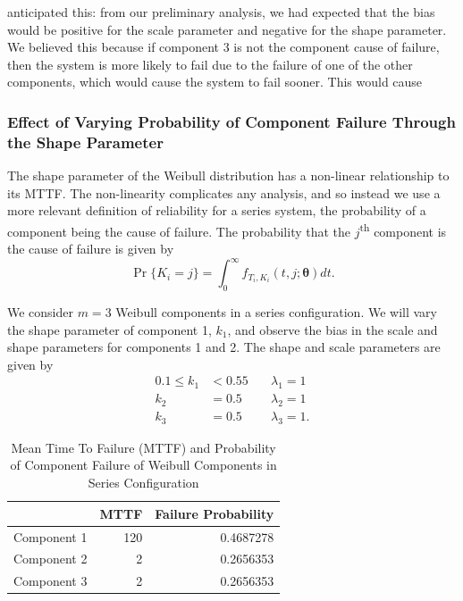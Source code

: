 \documentclass[
]{article}
\begin{document}
\begin{enumerate}
  anticipated this: from our preliminary analysis, we had expected that
  the bias would be positive for the scale parameter and negative for
  the shape parameter. We believed this because if component 3 is not
  the component cause of failure, then the system is more likely to fail
  due to the failure of one of the other components, which would cause
  the system to fail sooner. This would cause
\end{enumerate}

\hypertarget{effect-of-varying-probability-of-component-failure-through-the-shape-parameter}{%
\subsubsection{Effect of Varying Probability of Component Failure
Through the Shape
Parameter}\label{effect-of-varying-probability-of-component-failure-through-the-shape-parameter}}

The shape parameter of the Weibull distribution has a non-linear
relationship to its MTTF. The non-linearity complicates any analysis,
and so instead we use a more relevant definition of reliability for a
series system, the probability of a component being the cause of
failure. The probability that the \(j\)\textsuperscript{th} component is
the cause of failure is given by \[
\Pr\{K_i = j\} = \int_{0}^\infty f_{T_i, K_i}(t, j ; \boldsymbol{\theta}) dt.
\]

We consider \(m=3\) Weibull components in a series configuration. We
will vary the shape parameter of component 1, \(k_1\), and observe the
bias in the scale and shape parameters for components 1 and 2. The shape
and scale parameters are given by \begin{equation}
\begin{aligned}
    0.1 \leq k_1 &< 0.55    &\quad \lambda_1 = 1\\
             k_2 &= 0.5     &\quad \lambda_2 = 1\\
             k_3 &= 0.5     &\quad \lambda_3 = 1.
\end{aligned}
\end{equation}

\begin{table}

\caption{\label{tab:table-3}Mean Time To Failure (MTTF) and Probability of Component Failure of Weibull Components in Series Configuration}
\centering
\begin{tabular}[t]{l|r|r}
\hline
  & MTTF & Failure Probability\\
\hline
Component 1 & 120 & 0.4687278\\
\hline
Component 2 & 2 & 0.2656353\\
\hline
Component 3 & 2 & 0.2656353\\
\hline
\end{tabular}
\end{table}
\end{document}
